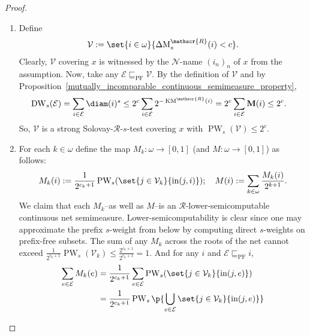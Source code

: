 \begin{proof}
    \begin{enumerate}[label = (\roman*)]
        \item Define
            \begin{align*}
                \mathcal{V} := \set{i \in \omega}{\operatorname{\Delta M}^{\mathscr{R}}_s(i) < c}.
            \end{align*}
            Clearly, $\mathcal{V}$ covering $x$ is witnessed by the $\mathcal{N}$-name $(i_n)_n$ of $x$ from the assumption. Now, take any $\mathcal{E} \sqsubseteq_{\operatorname{PF}} \mathcal{V}$. By the definition of $\mathcal{V}$ and by Proposition~\ref{mutually_incomparable_continuous_semimeasure_property},
            \begin{align*}
                \operatorname{DW}_s(\mathcal{E}) &= \sum_{i \in \mathcal{E}} \diam(i)^s \leq 2^c \sum_{i \in \mathcal{E}} 2^{-\operatorname{KM}^\mathscr{R}(i)} = 2^c \sum_{i \in \mathcal{E}} \mathbf{M}(i) \leq 2^c.
            \end{align*}
            So, $\mathcal{V}$ is a strong Solovay-$\mathscr{R}$-$s$-test covering $x$ with $\operatorname{PW}_s(\mathcal{V}) \leq 2^c$.
        \item For each $k \in \omega$ define the map $M_k: \omega \to [0, 1]$ (and $M: \omega \to [0, 1]$) as follows: 
            \begin{align*}
                M_k(i) := \frac{1}{2^{c_k + 1}} \operatorname{PW}_s(\set{j \in \mathcal{V}_k}{\operatorname{in}(j, i)}); \quad M(i) := \sum_{k \in \omega} \frac{M_k(i)}{2^{k + 1}}.
            \end{align*}
            We claim that each $M_k$--as well as $M$--is an $\mathscr{R}$-lower-semicomputable continuous net semimeasure. Lower-semicomputability is clear since one may approximate the prefix $s$-weight from below by computing direct $s$-weights on prefix-free subsets. The sum of any $M_k$ across the roots of the net cannot exceed $\frac{1}{2^{c_k + 1}} \operatorname{PW}_s(\mathcal{V}_k) \leq \frac{2^{c_k + 1}}{2^{c_k + 1}} = 1$. And for any $i$ and $\mathcal{E} \sqsubseteq_{\operatorname{PF}} i$,
            \begin{align*}
                \sum_{e \in \mathcal{E}} M_k(e) &= \frac{1}{2^{c_k + 1}} \sum_{e \in \mathcal{E}} \operatorname{PW}_s(\set{j \in \mathcal{V}_k}{\operatorname{in}(j, e)})\\
                &= \frac{1}{2^{c_k + 1}} \operatorname{PW}_s\p{ \bigcup_{e \in \mathcal{E}} \set{j \in \mathcal{V}_k}{\operatorname{in}(j, e)}}\\

\end{align*}
\end{enumerate}
\end{proof}
